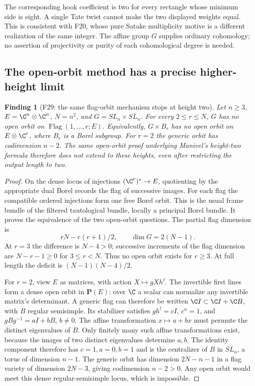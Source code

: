 \documentclass[11pt,a4paper]{article}
\newcommand{\fid}[1]{\textsf{#1}}\newcommand{\gate}[1]{\textsf{#1}}
\theoremstyle{named}\newtheorem{finding}{Finding}[section]
\theoremstyle{definition}\newtheorem{definition}[finding]{Definition}
\theoremstyle{remark}\newtheorem{remark}[finding]{Remark}
\begin{document}
The corresponding hook coefficient is two for every rectangle
whose minimum side is eight. A single Tate twist cannot make the
two displayed weights equal. This is consistent with \fid{F20},
whose pure Satake multiplicity motive is a different realization
of the same integer. The affine group $G$ supplies ordinary
cohomology; no assertion of projectivity or purity of each
cohomological degree is needed.


\subsection{The open-orbit method has a precise higher-height limit}
\begin{finding}[\fid{F29}: the same flag-orbit mechanism stops at height two]\label{f:sphericity}
Let $n\ge3$, $E=\C^n\otimes\C^n$, $N=n^2$, and
$G=SL_n\times SL_n$. For every $2\le r\le N$, $G$ has no
open orbit on $\operatorname{Flag}(1,\ldots,r;E)$.
Equivalently, $G\times B_r$ has no open orbit on $E\otimes\C^r$,
where $B_r$ is a Borel subgroup. For $r=2$ the generic orbit has
codimension $n-2$. The same open-orbit proof underlying Manivel's
height-two formula therefore does not extend to these heights,
even after restricting the output length to two.
\end{finding}
\begin{proof}
On the dense locus of injections $(\C^r)^*\to E$, quotienting
by the appropriate dual Borel records the flag of successive images.
For each flag the compatible ordered injections form one free Borel
orbit. This is the usual frame bundle of the filtered tautological
bundle, locally a principal Borel bundle. It proves the equivalence
of the two open-orbit questions. The partial flag dimension is
\[
 rN-r(r+1)/2,\qquad \dim G=2(N-1).
\]
At $r=3$ the difference is $N-4>0$; successive increments of the
flag dimension are $N-r-1\ge0$ for $3\le r<N$. Thus no open
orbit exists for $r\ge3$. At full length the deficit is
$(N-1)(N-4)/2$.

For $r=2$, view $E$ as matrices, with action $X\mapsto gXh^t$.
The invertible first lines form a dense open orbit in $\mathbf P(E)$:
over $\C$ a scalar can normalize any invertible matrix's determinant.
A generic flag can therefore be written
$\C I\subset\C I+\C B$, with $B$ regular semisimple.
Its stabilizer satisfies $gh^t=cI$, $c^n=1$, and
$gBg^{-1}=aI+bB$, $b\ne0$. The affine transformation
$x\mapsto a+bx$ must permute the distinct eigenvalues of $B$.
Only finitely many such affine transformations exist, because the
images of two distinct eigenvalues determine $a,b$. The identity
component therefore has $c=1,a=0,b=1$ and is the centralizer of
$B$ in $SL_n$, a torus of dimension $n-1$. The generic orbit has
dimension $2N-n-1$ in a flag variety of dimension $2N-3$,
giving codimension $n-2>0$. Any open orbit would meet this dense
regular-semisimple locus, which is impossible.
\end{proof}
\end{document}
